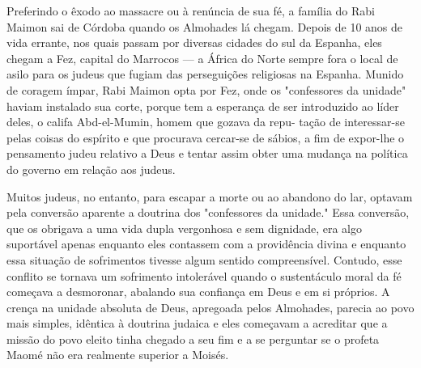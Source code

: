\begin{itemize}
Preferindo o êxodo ao massacre ou à renúncia de sua fé, a família do
Rabi Maimon sai de Córdoba quando os Almohades lá chegam. Depois de 10
anos de vida errante, nos quais passam por diversas cidades do sul da
Espa­nha, eles chegam a Fez, capital do Marrocos --- a África do Norte
sempre fora o local de asilo para os judeus que fugiam das perseguições
religiosas na Espa­nha. Munido de coragem ímpar, Rabi Maimon opta por
Fez, onde os "confes­sores da unidade" haviam instalado sua corte,
porque tem a esperança de ser introduzido ao líder deles, o califa
Abd-el-Mumin, homem que gozava da repu-
tação de interessar-se pelas coisas do espírito e que procurava
cercar-se de sá­bios, a fim de expor-lhe o pensamento judeu relativo a
Deus e tentar assim ob­ter uma mudança na política do governo em relação
aos judeus.

Muitos judeus, no entanto, para escapar a morte ou ao abandono do lar,
optavam pela conversão aparente a doutrina dos "confessores da
unida­de." Essa conversão, que os obrigava a uma vida dupla vergonhosa e
sem dig­nidade, era algo suportável apenas enquanto eles contassem com a
providência divina e enquanto essa situação de sofrimentos tivesse algum
sentido compreen­sível. Contudo, esse conflito se tornava um sofrimento
intolerável quando o sustentáculo moral da fé começava a desmoronar,
abalando sua confiança em Deus e em si próprios. A crença na unidade
absoluta de Deus, apregoada pelos Almohades, parecia ao povo mais
simples, idêntica à doutrina judaica e eles co­meçavam a acreditar que a
missão do povo eleito tinha chegado a seu fim e a se perguntar se o
profeta Maomé não era realmente superior a Moisés.


\end{itemize}
